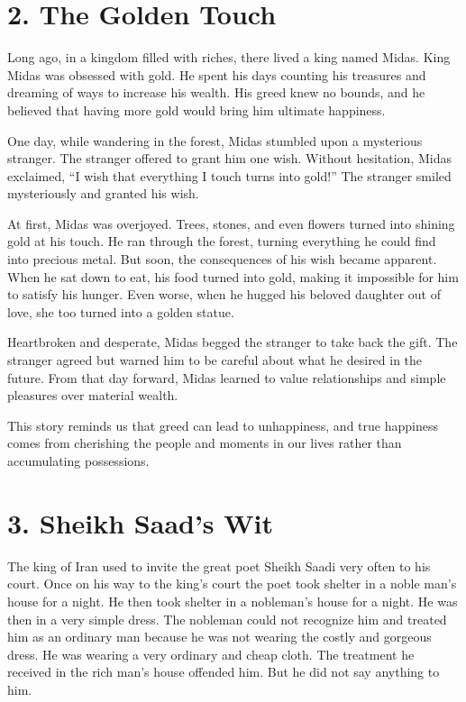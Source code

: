 \documentclass{article}
\begin{document}
\section*{2. The Golden Touch}

Long ago, in a kingdom filled with riches, there lived a king named Midas. King Midas was obsessed with gold. He spent his days counting his treasures and dreaming of ways to increase his wealth. His greed knew no bounds, and he believed that having more gold would bring him ultimate happiness.

One day, while wandering in the forest, Midas stumbled upon a mysterious stranger. The stranger offered to grant him one wish. Without hesitation, Midas exclaimed, “I wish that everything I touch turns into gold!” The stranger smiled mysteriously and granted his wish.

At first, Midas was overjoyed. Trees, stones, and even flowers turned into shining gold at his touch. He ran through the forest, turning everything he could find into precious metal. But soon, the consequences of his wish became apparent. When he sat down to eat, his food turned into gold, making it impossible for him to satisfy his hunger. Even worse, when he hugged his beloved daughter out of love, she too turned into a golden statue.

Heartbroken and desperate, Midas begged the stranger to take back the gift. The stranger agreed but warned him to be careful about what he desired in the future. From that day forward, Midas learned to value relationships and simple pleasures over material wealth.

This story reminds us that greed can lead to unhappiness, and true happiness comes from cherishing the people and moments in our lives rather than accumulating possessions.

\section*{3. Sheikh Saad’s Wit}
The king of Iran used to invite the great poet Sheikh Saadi very often to his court. Once on his way to the king’s court the poet took shelter in a noble man’s house for a night. He then took shelter in a nobleman’s house for a night. He was then in a very simple dress. The nobleman could not recognize him and treated him as an ordinary man because he was not wearing the costly and gorgeous dress. He was wearing a very ordinary and cheap cloth. The treatment he received in the rich man’s house offended him. But he did not say anything to him.
\end{document}
